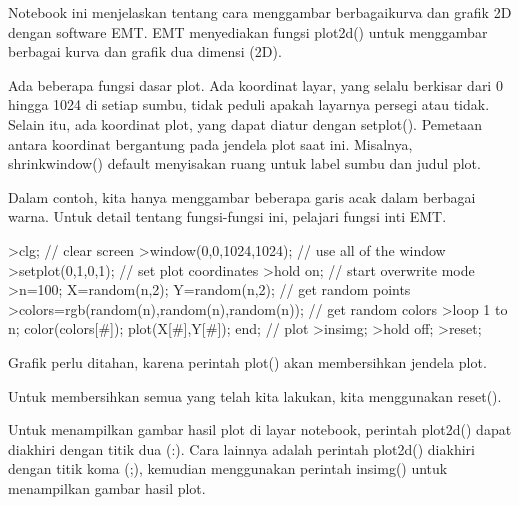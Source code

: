 \documentclass[a4paper,10pt]{article}
\begin{document}
\begin{eulernotebook}
\begin{eulercomment}
\begin{eulercomment}
\begin{eulercomment}
\begin{eulercomment}
\begin{eulercomment}
\begin{eulercomment}
\begin{eulercomment}
\begin{eulercomment}
\begin{eulercomment}
\begin{eulercomment}
\begin{eulercomment}
Notebook ini menjelaskan tentang cara menggambar berbagaikurva dan
grafik 2D dengan software EMT. EMT menyediakan fungsi plot2d() untuk
menggambar berbagai kurva dan grafik dua dimensi (2D).\\
\end{eulercomment}
\begin{eulercomment}
Ada beberapa fungsi dasar plot. Ada koordinat layar, yang selalu
berkisar dari 0 hingga 1024 di setiap sumbu, tidak peduli apakah
layarnya persegi atau tidak. Selain itu, ada koordinat plot, yang
dapat diatur dengan setplot(). Pemetaan antara koordinat bergantung
pada jendela plot saat ini. Misalnya, shrinkwindow() default
menyisakan ruang untuk label sumbu dan judul plot.

Dalam contoh, kita hanya menggambar beberapa garis acak dalam berbagai
warna. Untuk detail tentang fungsi-fungsi ini, pelajari fungsi inti
EMT.
\end{eulercomment}
\begin{eulerprompt}
>clg; // clear screen
>window(0,0,1024,1024); // use all of the window
>setplot(0,1,0,1); // set plot coordinates
>hold on; // start overwrite mode
>n=100; X=random(n,2); Y=random(n,2);  // get random points
>colors=rgb(random(n),random(n),random(n)); // get random colors
>loop 1 to n; color(colors[#]); plot(X[#],Y[#]); end; // plot
>insimg;
>hold off;
>reset;
\end{eulerprompt}
\begin{eulercomment}
Grafik perlu ditahan, karena perintah plot() akan membersihkan jendela
plot.

Untuk membersihkan semua yang telah kita lakukan, kita menggunakan
reset().

Untuk menampilkan gambar hasil plot di layar notebook, perintah
plot2d() dapat diakhiri dengan titik dua (:). Cara lainnya adalah
perintah plot2d() diakhiri dengan titik koma (;), kemudian menggunakan
perintah insimg() untuk menampilkan gambar hasil plot.


\end{eulercomment}
\end{eulercomment}
\end{eulercomment}
\end{eulercomment}
\end{eulercomment}
\end{eulercomment}
\end{eulercomment}
\end{eulercomment}
\end{eulercomment}
\end{eulercomment}
\end{eulercomment}
\end{eulernotebook}
\end{document}
